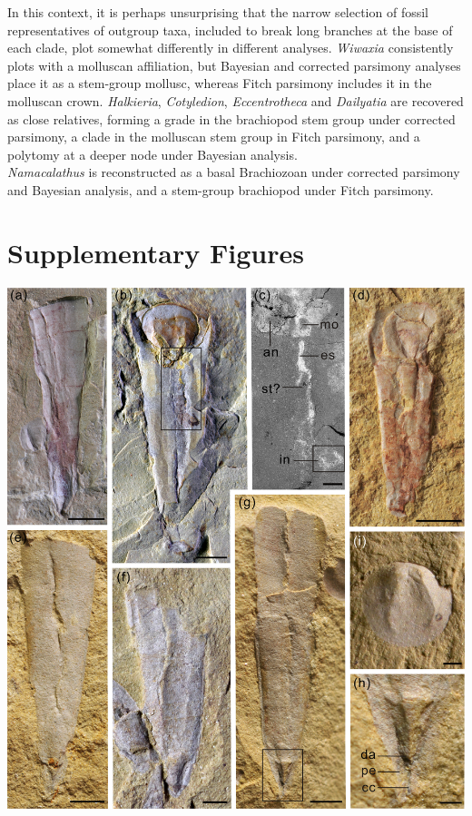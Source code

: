 \documentclass[openany]{book}
\begin{document}
\begin{description}
In this context, it is perhaps unsurprising that the narrow selection of
fossil representatives of outgroup taxa, included to break long branches
at the base of each clade, plot somewhat differently in different
analyses. \emph{Wiwaxia} consistently plots with a molluscan
affiliation, but Bayesian and corrected parsimony analyses place it as a
stem-group mollusc, whereas Fitch parsimony includes it in the molluscan
crown. \emph{Halkieria}, \emph{Cotyledion}, \emph{Eccentrotheca} and
\emph{Dailyatia} are recovered as close relatives, forming a grade in
the brachiopod stem group under corrected parsimony, a clade in the
molluscan stem group in Fitch parsimony, and a polytomy at a deeper node
under Bayesian analysis.\\
\emph{Namacalathus} is reconstructed as a basal Brachiozoan under
corrected parsimony and Bayesian analysis, and a stem-group brachiopod
under Fitch parsimony.
\end{description}

\hypertarget{figures}{\chapter*{Supplementary Figures}\label{figures}}

\begin{center}\includegraphics[width=0.8\linewidth]{images/image1} \end{center}
\end{document}
